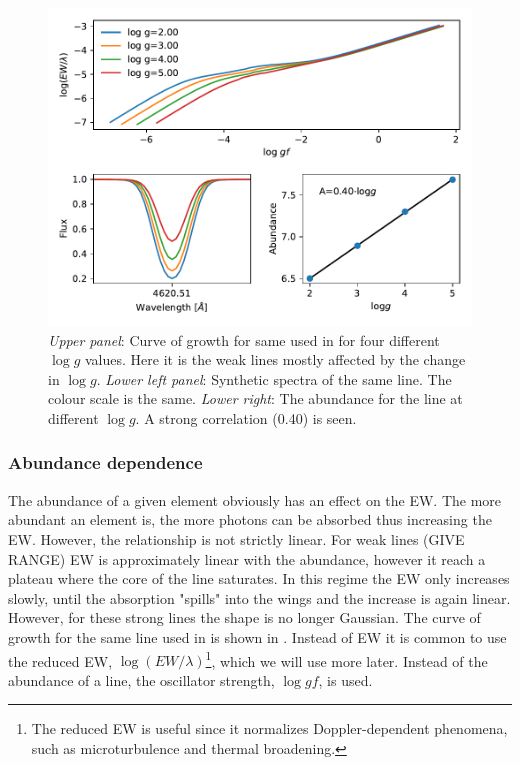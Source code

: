 \begin{figure}[htpb!]
    \centering
    \includegraphics[width=1.0\linewidth]{figures/ewGravity.pdf}
    \caption{\emph{Upper panel}: Curve of growth for same  used in
              for four different $\log g$ values. Here it is
             the weak lines mostly affected by the change in $\log g$.
             \emph{Lower left panel}: Synthetic spectra of the same line. The
             colour scale is the same.
             \emph{Lower right}: The abundance for the line at different
             $\log g$. A strong correlation (0.40) is seen.}
    \label{fig:ewGravity}
\end{figure}




\subsubsection{Abundance dependence}

The abundance of a given element obviously has an effect on the EW. The more
abundant an element is, the more photons can be absorbed thus increasing the EW.
However, the relationship is not strictly linear. For weak lines (GIVE RANGE) EW
is approximately linear with the abundance, however it reach a plateau where the
core of the line saturates. In this regime the EW only increases slowly, until
the absorption "spills" into the wings and the increase is again linear.
However, for these strong lines the shape is no longer Gaussian. The curve of
growth for the same  line used in  is shown in
. Instead of EW it is common to use the reduced EW, $\log
(EW/\lambda)$\footnote{The reduced EW is useful since it normalizes
Doppler-dependent phenomena, such as microturbulence and thermal broadening.},
which we will use more later. Instead of the abundance of a line, the oscillator
strength, $\log \mathit{gf}$, is used.

